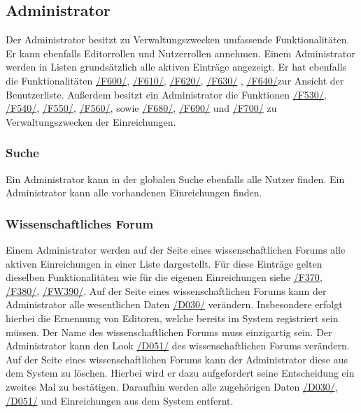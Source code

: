 \subsection{Administrator}
Der Administrator besitzt zu Verwaltungszwecken umfassende Funktionalitäten. Er kann ebenfalls Editorrollen und Nutzerrollen annehmen.
Einem Administrator werden in Listen grundsätzlich alle aktiven Einträge angezeigt. Er hat ebenfalls die Funktionalitäten
\hyperref[funkt:600]{/F600/}, \hyperref[funkt:610]{/F610/}, \hyperref[funkt:620]{/F620/}, \hyperref[funkt:630]{/F630/}
, \hyperref[funkt:640]{/F640/}zur Ansicht der Benutzerliste.
Außerdem besitzt ein Administrator die Funktionen \hyperref[funkt:530]{/F530/}, \hyperref[funkt:540]{/F540/},
\hyperref[funkt:550]{/F550/}, \hyperref[funkt:560]{/F560/}, sowie \hyperref[funkt:680]{/F680/}, \hyperref[funkt:690]{/F690/} und
\hyperref[funkt:700]{/F700/}
zu Verwaltungszwecken der Einreichungen.

\subsubsection{Suche}
\begin{description}
     Ein Administrator kann in der globalen Suche ebenfalls alle Nutzer finden.
     Ein Administrator kann alle vorhandenen Einreichungen finden.
\end{description}

\subsubsection{Wissenschaftliches Forum}
\begin{description}
     Einem Administrator werden auf der Seite eines wissenschaftlichen Forums
    alle aktiven Einreichungen in einer Liste dargestellt.
    Für diese Einträge gelten dieselben Funktionalitäten wie für die
    eigenen Einreichungen siehe \hyperref[funkt:370]{/F370}, \hyperref[funkt:380]{/F380/}, \hyperref[funkt:390]{/FW390/}.
     Auf der Seite eines wissenschaftlichen Forums kann der Administrator alle wesentlichen Daten \hyperref[d030]{/D030/}
    verändern. Insbesondere erfolgt hierbei die Ernennung von Editoren, welche bereits im System
    registriert sein  müssen. Der Name des wissenschaftlichen Forums muss einzigartig sein.
     Der Administrator kann den Look \hyperref[d051]{/D051/}
    des wissenschaftlichen Forums verändern.
     Auf der Seite eines wissenschaftlichen Forums kann der Administrator diese aus dem System zu löschen.
    Hierbei wird er dazu aufgefordert seine Entscheidung ein zweites Mal zu bestätigen.
    Daraufhin werden alle zugehörigen Daten \hyperref[d030]{/D030/}, \hyperref[d051]{/D051/}
    und Einreichungen aus dem System entfernt.
\end{description}

